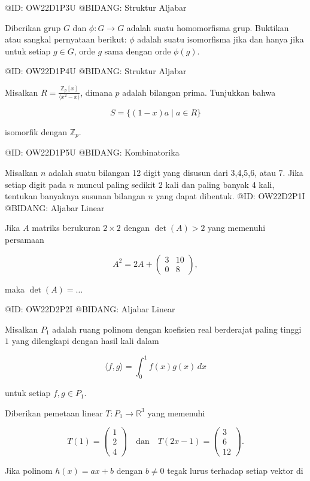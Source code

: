 @ID: OW22D1P3U
@BIDANG: Struktur Aljabar

Diberikan grup $G$ dan $\phi : G \to G$ adalah suatu homomorfisma grup. Buktikan atau sangkal pernyataan berikut: $\phi$ adalah suatu isomorfisma jika dan hanya jika untuk setiap $g \in G$, orde $g$ sama dengan orde $\phi(g)$.

@ID: OW22D1P4U
@BIDANG: Struktur Aljabar

Misalkan $R = \frac{\mathbb{Z}_p[x]}{\langle x^2 - x \rangle}$, dimana $p$ adalah bilangan prima. Tunjukkan bahwa 

$$
S = \{ (1-x)a \mid a \in R \}
$$

isomorfik dengan $\mathbb{Z}_p$.

@ID: OW22D1P5U
@BIDANG: Kombinatorika

Misalkan $n$ adalah suatu bilangan 12 digit yang disusun dari 3,4,5,6, atau 7. Jika setiap digit pada $n$ muncul paling sedikit 2 kali dan paling banyak 4 kali, tentukan banyaknya susunan bilangan $n$ yang dapat dibentuk.
@ID: OW22D2P1I
@BIDANG: Aljabar Linear

Jika $A$ matriks berukuran $2\times2$ dengan $\det(A)>2$ yang memenuhi persamaan

$$
A^2=2A+\begin{pmatrix}3&10\\0&8\end{pmatrix},
$$

maka $\det(A)=\ldots$

@ID: OW22D2P2I
@BIDANG: Aljabar Linear

Misalkan $P_1$ adalah ruang polinom dengan koefisien real berderajat paling tinggi $1$ yang dilengkapi dengan hasil kali dalam

$$
\langle f,g\rangle=\int_0^1 f(x)g(x)\,dx
$$

untuk setiap $f,g\in P_1$.

Diberikan pemetaan linear $T:P_1\to\mathbb R^3$ yang memenuhi

$$
T(1)=\begin{pmatrix}1\\2\\4\end{pmatrix}
\quad\text{dan}\quad
T(2x-1)=\begin{pmatrix}3\\6\\12\end{pmatrix}.
$$

Jika polinom $h(x)=ax+b$ dengan $b\neq0$ tegak lurus terhadap setiap vektor di

